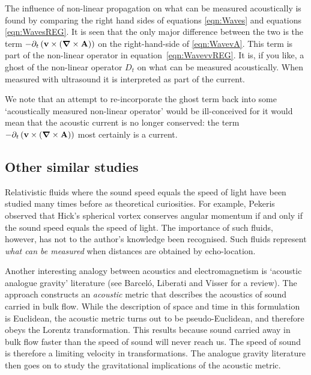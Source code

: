 \documentclass[10pt, fleqn,final,showtrims,oldfontcommands, article,a4paper,oneside]{memoir} %
\newcommand{\eqnref}[1]{\ref{eqn:#1}}
\newcommand{\lr}[1]{\left( #1 \right)}
\renewcommand{\d}{\partial}
\newcommand{\del}{\nabla}
\newcommand{\vdel}{ \mbox{\boldmath $\del$}}
\newcommand{\dt}{{\d_t}}
\newcommand{\Dt}{D_t}
\newcommand{\vA}{\textbf{A}}
\newcommand{\vv}{\textbf{v}}
\begin{document}
The influence of non-linear propagation on what can be measured acoustically is found by comparing the right hand sides of equations \eqnref{Waves} and equations \eqnref{WavesREG}.
It is seen that the only major difference between the two is the term $- \dt \lr{ \vv \times \lr{\vdel \times \vA}}$ on the right-hand-side of \eqnref{WavevA}.
This term is part of the non-linear operator in equation~\ref{eqn:WavevvREG}.
It is, if you like, a ghost of the non-linear operator $\Dt$ on what can be measured acoustically.
When measured with ultrasound it is interpreted  as part of the current.

We note that an attempt to re-incorporate the ghost  term back into some `acoustically measured non-linear operator' would be ill-conceived 
for it would mean that the acoustic current is no longer conserved:
the term $- \dt \lr{ \vv \times \lr{\vdel \times \vA}}$ most certainly is a current.




\subsection{Other similar studies}
Relativistic fluids where the sound speed equals the speed of light have been studied many times before
as theoretical curiosities\cite{Taub1978,Pekeris1977}.
For example, Pekeris observed that Hick's spherical vortex conserves angular momentum if and only if
the sound speed equals the speed of light\cite{Pekeris1977}.
The importance of such fluids, however, has not to the author's knowledge been recognised.
Such fluids represent {\em what can be measured} when distances are obtained by echo-location.

Another interesting analogy between acoustics and electromagnetism is `acoustic analogue gravity' literature (see Barcel{\'o}, Liberati and Visser\cite{Barcelo2005} for a review).
The approach constructs an {\em acoustic} metric that describes the acoustics of sound carried in bulk flow.
While the description of space and time in this formulation is Euclidean, the acoustic metric turns out to be pseudo-Euclidean,
and therefore obeys the Lorentz transformation.
This results because sound carried away in bulk flow  faster than the speed of sound will never reach us.
The speed of sound is  therefore a limiting velocity in transformations.
The analogue gravity literature then goes on to study the gravitational implications of the acoustic metric.
\end{document}
